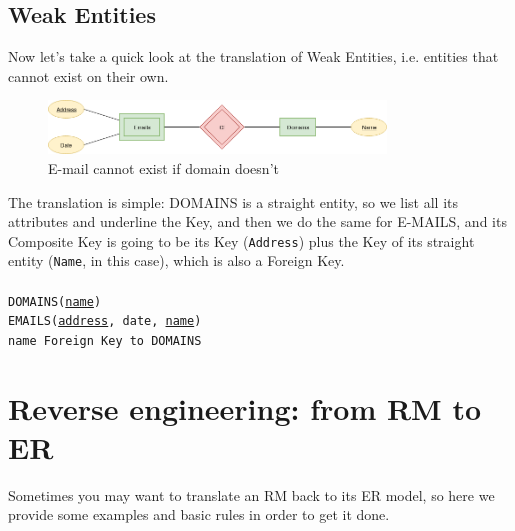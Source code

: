 \documentclass[12pt, oneside]{report}
\newcommand\tab[1][1cm]{\hspace*{#1}}
\begin{document}
\section{Weak Entities}
Now let's take a quick look at the translation of Weak Entities, i.e. entities that cannot exist on their own.\\
\begin{figure}[H]
	\centering
	\includegraphics[width=0.8\textwidth,keepaspectratio]{diagram4_00.png}
	\caption{E-mail cannot exist if domain doesn't}
	\label{diagram4_00}
\end{figure}
\vskip 5pt
The translation is simple: DOMAINS is a straight entity, so we list all its attributes and underline the Key, and then we do the same for E-MAILS, and its Composite Key is going to be its Key (\texttt{Address}) plus the Key of its straight entity (\texttt{Name}, in this case), which is also a Foreign Key.\\\\
\texttt{DOMAINS(\underline{name})}\\
\texttt{EMAILS(\underline{address}, date, \underline{name})}\\
\tab[.4cm] \texttt{name Foreign Key to DOMAINS}
\vskip 5pt

\chapter{Reverse engineering: from RM to ER}
Sometimes you may want to translate an RM back to its ER model, so here we provide some examples and basic rules in order to get it done.
\end{document}

